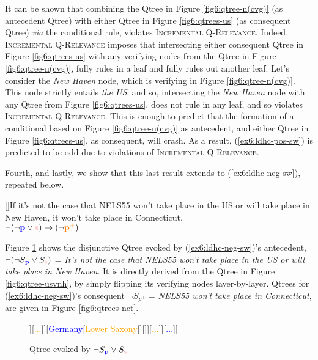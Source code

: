 It can be shown that combining the Qtree in Figure \ref{fig6:qtree-n(cvg)} (as antecedent Qtree) with either Qtree in Figure \ref{fig6:qtrees-us} (as consequent Qtree) \textit{via} the conditional rule, violates \textsc{Incremental Q-Relevance}. Indeed, \textsc{Incremental Q-Relevance} imposes that intersecting either consequent Qtree in Figure \ref{fig6:qtrees-us} with any verifying nodes from the Qtree in Figure \ref{fig6:qtree-n(cvg)}, fully rules in a leaf and fully rules out another leaf. Let's consider the \textit{New Haven} node, which is verifying in Figure \ref{fig6:qtree-n(cvg)}. This node strictly entails \textit{the US}, and so, intersecting the \textit{New Haven} node with any Qtree from Figure \ref{fig6:qtrees-us}, does not rule in any leaf, and so violates \textsc{Incremental Q-Relevance}. This is enough to predict that the formation of a conditional based on Figure \ref{fig6:qtree-n(cvg)} as antecedent, and either Qtree in Figure \ref{fig6:qtrees-us}, as consequent, will crash. As a result, (\ref{ex6:ldhc-pos-sw}) is predicted to be odd due to violations of \textsc{Incremental Q-Relevance}.

Fourth, and lastly, we show that this last result extends to (\ref{ex6:ldhc-neg-sw}), repeated below.

\begin{exe}
	[]{If it's not the case that NELS55 won't take place in the US or will take place in New Haven, it won't take place in Connecticut.\\
		$\neg(\neg \p \vee \s) \rightarrow(\neg \pplus)$}
\end{exe}

Figure \ref{fig6:qtree-n(usvnh)}  shows the disjunctive Qtree evoked by (\ref{ex6:ldhc-neg-sw})'s antecedent, $\neg (\neg S_{\p} \vee S_{\s})$ = \textit{It's not the case that NELS55 won't take place in the US or will take place in New Haven}. It is directly derived from the Qtree in Figure \ref{fig6:qtree-usvnh}, by simply flipping its verifying nodes layer-by-layer. Qtrees for (\ref{ex6:ldhc-neg-sw})'s consequent $\neg S_{p^+}$ = \textit{NELS55 won't take place in Connecticut}, are given in Figure \ref{fig6:qtrees-nct}. 


\begin{figure}[H]
	\centering
	\begin{forest}
		[CS[\fbox{\textcolor{blue}{US}}[{\textcolor{orange}{Connecticut}}[{\textcolor{pink}{New Haven}}][\fbox{\textcolor{pink}{...}}]][\textcolor{orange}{...}]][{\textcolor{blue}{Germany}}[\textcolor{orange}{Lower Saxony}[\fbox{\textcolor{pink}{Göttingen}}][\fbox{\textcolor{pink}{...}}]][\textcolor{orange}{...}]][{\textcolor{blue}{...}}]]
	\end{forest}
	\caption[]{Qtree evoked by $\neg S_{\p} \vee S_{\s}$}\label{fig6:qtree-n(usvnh)}
\end{figure}


